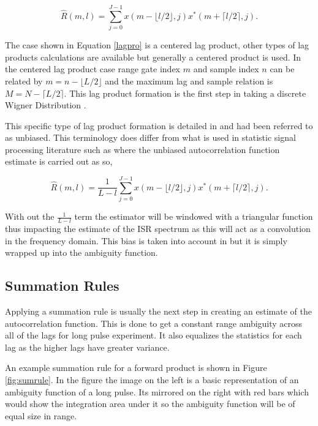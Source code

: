 \documentclass[draft,ras]{agutex}
\begin{document}
\begin{article}
\begin{equation}
\label{lagpro}
\hat{R}(m,l) = \displaystyle\sum\limits_{j=0}^{J-1} x(m-\lfloor l/2\rfloor,j)x^*(m+\lceil l/2 \rceil,j).
\end{equation}

The case shown in Equation \ref{lagpro} is a centered lag product, other types of lag products calculations are available but generally a centered product is used. In the centered lag product case range gate index $m$ and sample index $n$ can be related by $m=n-\lfloor L/2\rfloor$ and the maximum lag and sample relation is $M=N-\lceil L/2 \rceil$.  This lag product formation is the first step in taking a discrete Wigner Distribution \citep{TFAcohen}.

This specific type of lag product formation is detailed in \citep{farley1969} and had been referred to as unbiased. This terminology does differ from what is used in statistic signal processing literature such as \citep{randomsigshanmugan} where the unbiased autocorrelation function estimate is carried out as so,

\begin{equation}
\label{eq:lagproub}
\hat{R}(m,l) = \frac{1}{L-l}\displaystyle\sum\limits_{j=0}^{J-1} x(m-\lfloor l/2\rfloor,j)x^*(m+\lceil l/2 \rceil,j).
\end{equation}

\noindent With out the $\frac{1}{L-l}$ term the estimator will be windowed with a triangular function thus impacting the estimate of the ISR spectrum as this will act as a convolution in the frequency domain. This bias is taken into account in \citep{farley1969} but it is simply wrapped up into the ambiguity function. 

\subsection{Summation Rules}
Applying a summation rule is usually the next step in creating an estimate of the autocorrelation function.  This is done to get a constant range ambiguity across all of the lags for long pulse experiment\citep{nygren1996}. It also equalizes the statistics for each lag as the higher lags have greater variance. 

An example summation rule for a forward product is shown in Figure \ref{fig:sumrule}. In the figure the image on the left is a basic representation of an ambiguity function of a long pulse.  Its mirrored on the right with red bars which would show the integration area under it so the ambiguity function will be of equal size in range.  


\end{article}
\end{document}
